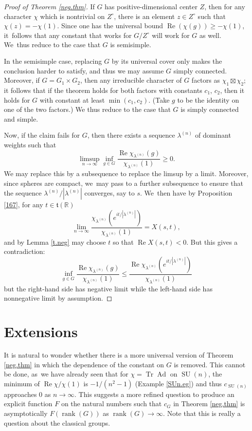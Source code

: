 \documentclass[JEP,XML,SOM,Unicode,NoFloatCountersInSection,published]{cedram}
\theoremstyle{definition}
\let\ic\circ
\newcommand{\mft}{\mathfrak{t}}
\newcommand{\R}{\mathbb{R}}
\DeclareMathOperator{\RE}{Re}
\DeclareMathOperator{\SU}{SU}
\DeclareMathOperator{\Tr}{Tr}
\DeclareMathOperator{\Ad}{Ad}
\DeclareMathOperator{\rank}{rank}
\begin{document}
\begin{proof}[Proof of Theorem \ref{neg.thm}]
If $G$ has positive-dimensional center $Z$, then for any character $\chi$
which is nontrivial on $Z^\ic$, there is an element $z\in Z^\ic$ such that
$\chi(z)=-\chi(1)$. Since one has the universal bound $\RE(\chi(g))\ge
-\chi(1)$, it~follows that any constant that works for $G/Z^\ic$ will work
for $G$ as well. We~thus reduce to the case that $G$ is semisimple.

In the semisimple case, replacing $G$ by its universal cover only makes the conclusion harder to satisfy, and thus we may assume $G$ simply connected. Moreover, if $G=G_1\times G_2$, then any irreducible character of $G$ factors as $\chi_1\boxtimes \chi_2$; it follows that if the theorem holds for both factors with constants $c_1$, $c_2$, then it holds for $G$ with constant at least $\min(c_1,c_2)$. (Take $g$ to be the identity on one of the two factors.) We thus reduce to the case that $G$ is simply connected and simple.

Now, if the claim fails for $G$, then there exists a sequence $\lambda^{(n)}$
of dominant weights such that\vspace*{-3pt}
\[
\limsup_{n\to\infty} \inf_{g\in G}
\frac{\RE\chi_{\lambda^{(n)}}(g)}{\chi_{\lambda^{(n)}}(1)}\ge 0.
\]
We may replace this by a subsequence to replace the limsup by a limit.
Moreover, since spheres are compact, we~may pass to a further subsequence
to ensure that the sequence $\lambda^{(n)}/|\lambda^{(n)}|$ converges,
say to $s$. We~then have by Proposition \ref{167}, for any $t\in \mft(\R)$\vspace*{-3pt}
\[
\lim_{n\to\infty}
\frac{\chi_{\lambda^{(n)}}(e^{it/|\lambda^{(n)}|})}{\chi_{\lambda^{(n)}}(1)}
=
X(s,t),
\]
and by Lemma \ref{t.neg} may choose $t$ so that $\RE X(s,t)<0$. But this gives a
contradiction:\vspace*{-3pt}
\[
\inf_{g\in G}
\frac{\RE\chi_{\lambda^{(n)}}(g)}{\chi_{\lambda^{(n)}}(1)}
\le
\frac{\RE \chi_{\lambda^{(n)}}(e^{it/|\lambda^{(n)}|})}{\chi_{\lambda^{(n)}}(1)}
\]
but the right-hand side has negative limit while the left-hand side has
nonnegative limit by assumption.
\end{proof}

\section{Extensions}

It is natural to wonder whether there is a more universal version of Theorem \ref{neg.thm} in which the dependence of the constant on $G$ is removed. This cannot be done, as~we have already seen that for $\chi=\Tr\Ad$ on $\SU(n)$, the minimum of $\RE\chi/\chi(1)$ is $-1/(n^2-1)$ (Example \ref{SUn.eg}) and thus $c_{\SU(n)}$ approaches $0$ as $n\to\infty$. This suggests a more refined question to produce an explicit function $F$ on the natural numbers such that $c_G$ in Theorem \ref{neg.thm} is asymptotically $F(\rank(G))$ as $\rank(G) \to \infty$. Note that this is really a question about the classical groups.
\end{document}
